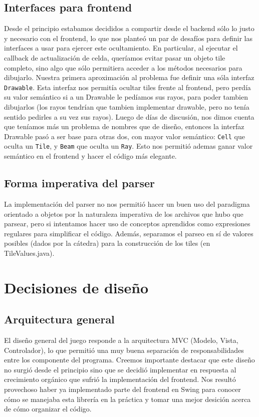 \documentclass[a4paper, 11pt]{article}
\begin{document}
	\subsection{Interfaces para frontend}
	Desde el principio estabamos decididos a compartir desde el backend sólo lo justo y necesario con el frontend, lo que nos planteó un par de desafíos para definir las interfaces a usar para ejercer este ocultamiento. En particular, al ejecutar el callback de actualización de celda, queríamos evitar pasar un objeto tile completo, sino algo que sólo permitiera acceder a los métodos necesarios para dibujarlo. Nuestra primera aproximación al problema fue definir una sóla interfaz \texttt{Drawable}. Esta interfaz nos permitía ocultar tiles frente al frontend, pero perdía su valor semántico si a un Drawable le pedíamos sus rayos, para poder tambien dibujarlos (los rayos tendrían que tambien implementar drawable, pero no tenía sentido pedirles a su vez sus rayos). Luego de días de discusión, nos dimos cuenta que teníamos más un problema de nombres que de diseño, entonces la interfaz Drawable pasó a ser base para otras dos, con mayor valor semántico: \texttt{Cell} que oculta un \texttt{Tile}, y \texttt{Beam} que oculta un \texttt{Ray}. Esto nos permitió ademas ganar valor semántico en el frontend y hacer el código más elegante.

	\subsection{Forma imperativa del parser}
	La implementación del parser no nos permitió hacer un buen uso del paradigma orientado a objetos por la naturaleza imperativa de los archivos que hubo que parsear, pero si intentamos hacer uso de conceptos aprendidos como expresiones regulares para simplificar el código. Además, separamos el parseo en sí de valores posibles (dados por la cátedra) para la construcción de los tiles (en TileValues.java).

\section{Decisiones de diseño} 

	\subsection{Arquitectura general}
	El diseño general del juego responde a la arquitectura MVC (Modelo, Vista, Controlador), lo que permitió una muy buena separación de responsabilidades entre los componente del programa. Creemos importante destacar que este diseño no surgió desde el principio sino que se decidió implementar en respuesta al crecimiento orgánico que sufrió la implementación del frontend. Nos resultó provechoso haber ya implementado parte del frontend en Swing para conocer cómo se manejaba esta librería en la práctica y tomar una mejor desición acerca de cómo organizar el código.
\end{document}
